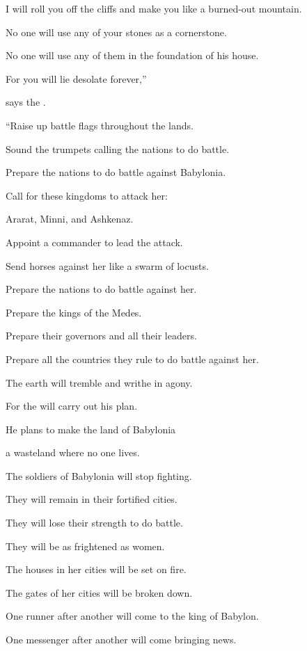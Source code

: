 {\par }{\Q I will roll
you off the cliffs
and make
you like a burned-out
mountain.
\par }{\Q {}No
one
will use any
of your stones
as a cornerstone.
\par }{\Q No one
will use any
of them in the foundation
of his house.
\par }{\Q For
you will lie desolate
forever,”
\par }{\Q says
the {}.
\par }{\Q {}“Raise
up battle flags
throughout the lands.
\par }{\Q Sound the trumpets
calling the nations
to do battle.
\par }{\Q Prepare
the nations
to do battle against Babylonia.
\par }{\Q Call for these kingdoms
to attack her:
\par }{\Q Ararat,
Minni,
and Ashkenaz.
\par }{\Q Appoint
a commander
to lead the attack.
\par }{\Q Send horses
against her like a swarm
of locusts.
\par }{\Q {}Prepare
the nations
to do battle against
her.

\par }{\Q Prepare the kings
of the Medes.
\par }{\Q Prepare their governors
and all
their leaders.
\par }{\Q Prepare all
the countries
they rule to do battle against her.
\par }{\Q {}The earth
will tremble
and writhe
in agony.

\par }{\Q For
the {}
will carry
out his plan.
\par }{\Q He plans
to make
the land
of Babylonia
\par }{\Q a wasteland
where no
one lives.
\par }{\Q {}The soldiers
of Babylonia
will stop
fighting.
\par }{\Q They will remain
in their fortified cities.
\par }{\Q They will lose
their strength
to do battle.

\par }{\Q They will be
as frightened as women.
\par }{\Q The houses in her cities
will be set on fire.
\par }{\Q The gates
of her cities will be broken down.
\par }{\Q {}One runner
after another will come
to the king of Babylon.
\par }{\Q One
messenger after another will come
bringing news.

}
